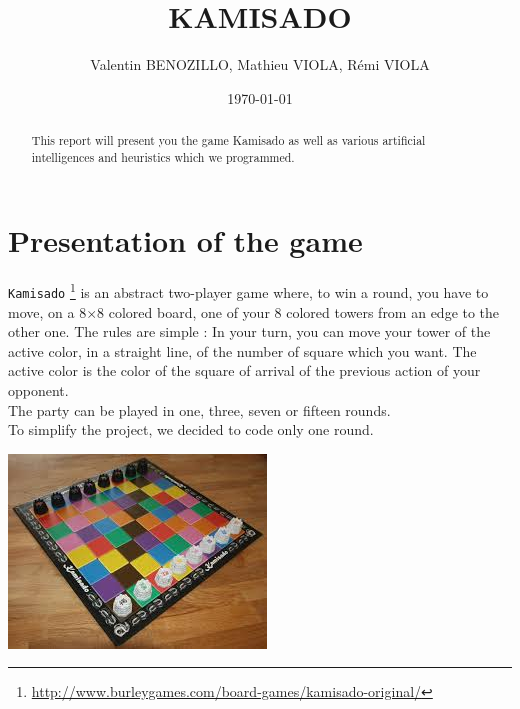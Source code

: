 \documentclass[a4paper, 11pt]{article}
\title{KAMISADO}
\author{Valentin BENOZILLO, Mathieu VIOLA, Rémi VIOLA}
\date{\today}
\begin{document}
\maketitle

\begin{abstract}
This report will present you the game Kamisado as well as various artificial intelligences and heuristics which we programmed.
\end{abstract}

\newpage

\tableofcontents

\newpage

\section{Presentation of the game}
\verb?Kamisado? \footnote{\url{http://www.burleygames.com/board-games/kamisado-original/}} is an abstract two-player game where, to win a round, you have to move, on a 8$\times$8 colored board, one of your 8 colored towers from an edge to the other one. The rules are simple : In your turn, you can move your tower of the active color, in a straight line, of the number of square which you want. The active color is the color of the square of arrival of the previous action of your opponent.\\
The party can be played in one, three, seven or fifteen rounds.\\
To simplify the project, we decided to code only one round.
\begin{center}
\includegraphics[scale = 0.06]{kamisado.jpeg}
\end{center}
\end{document}

